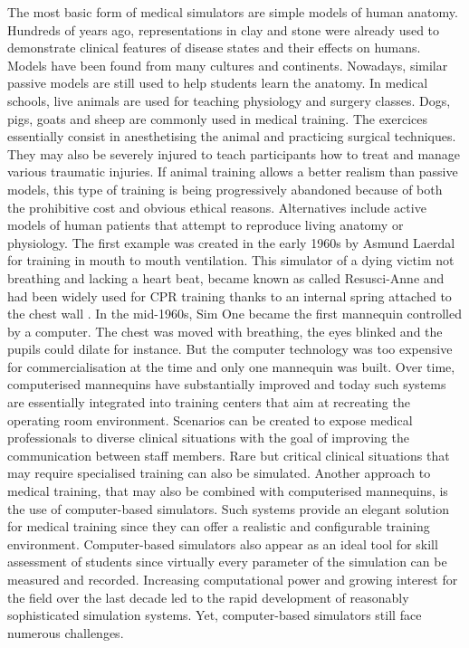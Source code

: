\bigskip

The most basic form of medical simulators are simple models of human anatomy. Hundreds of years ago, representations in clay and stone were already used to demonstrate clinical features of disease states and their effects on humans. Models have been found from many cultures and continents. Nowadays, similar passive models are still used to help students learn the anatomy. In medical schools, live animals are used for teaching physiology and surgery classes. Dogs, pigs, goats and sheep are commonly used in medical training. The exercices essentially consist in anesthetising the animal and practicing surgical techniques. They may also be severely injured to teach participants how to treat and manage various traumatic injuries. If animal training allows a better realism than passive models, this type of training is being progressively abandoned because of both the prohibitive cost and obvious ethical reasons. Alternatives include active models of human patients that attempt to reproduce living anatomy or physiology. The first example was created in the early 1960s by Asmund Laerdal for training in mouth to mouth ventilation. This simulator of a dying victim not breathing and lacking a heart beat, became known as called Resusci-Anne and had been widely used for CPR training thanks to an internal spring attached to the chest wall \citep{Cooper04}. In the mid-1960s, Sim One became the first mannequin controlled by a computer. The chest was moved with breathing, the eyes blinked and the pupils could dilate for instance. But the computer technology was too expensive for commercialisation at the time and only one mannequin was built. Over time, computerised mannequins have substantially improved and today such systems are essentially integrated into training centers that aim at recreating the operating room environment. Scenarios can be created to expose medical professionals to diverse clinical situations with the goal of improving the communication between staff members. Rare but critical clinical situations that may require specialised training can also be simulated. Another approach to medical training, that may also be combined with computerised mannequins, is the use of computer-based simulators. Such systems provide an elegant solution for medical training since they can offer a realistic and configurable training environment. Computer-based simulators also appear as an ideal tool for skill assessment of students since virtually every parameter of the simulation can be measured and recorded. Increasing computational power and growing interest for the field over the last decade led to the rapid development of reasonably sophisticated simulation systems. Yet, computer-based simulators still face numerous challenges. 


